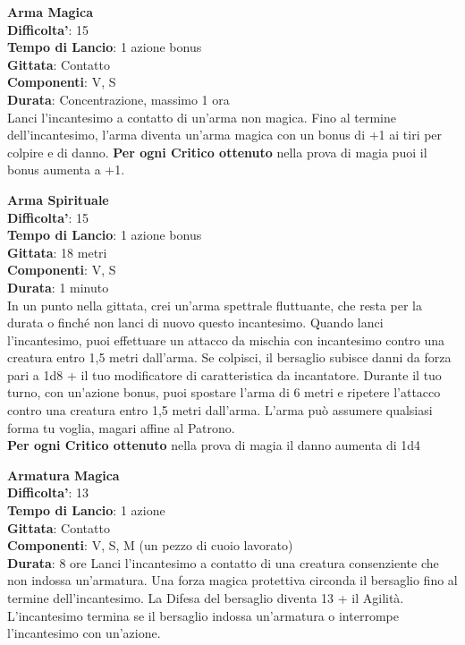 \begin{multicols}{2}
\medskip\textbf{Arma Magica}\\
\textbf{Difficolta'}: 15\\
\textbf{Tempo di Lancio}: 1 azione bonus\\
\textbf{Gittata}: Contatto\\
\textbf{Componenti}: V, S\\
\textbf{Durata}: Concentrazione, massimo 1 ora\\
Lanci l’incantesimo a contatto di un’arma non magica. Fino al termine dell’incantesimo, l’arma diventa un’arma magica con un bonus di +1 ai tiri per colpire e di danno.
\textbf{Per ogni Critico ottenuto} nella prova di magia puoi il bonus aumenta a +1.

\medskip\textbf{Arma Spirituale}\\
\textbf{Difficolta'}: 15\\
\textbf{Tempo di Lancio}: 1 azione bonus\\
\textbf{Gittata}: 18 metri\\
\textbf{Componenti}: V, S\\
\textbf{Durata}: 1 minuto\\
In un punto nella gittata, crei un’arma spettrale fluttuante, che resta per la durata o finché non lanci di nuovo questo incantesimo. Quando lanci l’incantesimo, puoi effettuare un attacco da mischia con incantesimo contro una creatura entro 1,5 metri dall’arma. Se colpisci, il bersaglio subisce danni da forza pari a 1d8 + il tuo modificatore di caratteristica da incantatore. Durante il tuo turno, con un’azione bonus, puoi spostare l’arma di 6 metri e ripetere l’attacco contro una creatura entro 1,5 metri dall’arma. L’arma può assumere qualsiasi forma tu voglia, magari affine al Patrono.\\
\textbf{Per ogni Critico ottenuto} nella prova di magia il danno aumenta di 1d4

\medskip\textbf{Armatura Magica}\\
\textbf{Difficolta'}: 13\\
\textbf{Tempo di Lancio}: 1 azione\\
\textbf{Gittata}: Contatto\\
\textbf{Componenti}: V, S, M (un pezzo di cuoio lavorato)\\
\textbf{Durata}: 8 ore
Lanci l’incantesimo a contatto di una creatura consenziente che non indossa un’armatura. Una forza magica protettiva circonda il bersaglio fino al termine dell’incantesimo. La Difesa del bersaglio diventa 13 + il Agilità. L’incantesimo termina se il bersaglio indossa un’armatura o interrompe l’incantesimo con un’azione.



\end{multicols}
